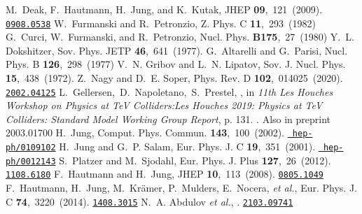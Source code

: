 \documentclass[11pt]{article} \usepackage{mystyle-new}
\begin{document}
\begin{mcbibliography}{10}
\relax
{}
M.~Deak, F.~Hautmann, H.~Jung, and K.~Kutak,
\newblock JHEP{} {\bf 09},~121~(2009).
\newblock \href{http://www.arXiv.org/abs/0908.0538}{{\tt 0908.0538}}\relax
\relax
{}
W.~Furmanski and R.~Petronzio,
\newblock Z. Phys. C{} {\bf 11},~293~(1982)\relax
\relax
{}
G.~Curci, W.~Furmanski, and R.~Petronzio,
\newblock Nucl. Phys.{} {\bf B175},~27~(1980)\relax
\relax
{}
Y.~L. Dokshitzer,
\newblock Sov. Phys. JETP{} {\bf 46},~641~(1977).
\relax
\relax
{}
G.~Altarelli and G.~Parisi,
\newblock Nucl. Phys. B{} {\bf 126},~298~(1977)\relax
\relax
{}
V.~N. Gribov and L.~N. Lipatov,
\newblock Sov. J. Nucl. Phys.{} {\bf 15},~438~(1972).
\relax
\relax
{}
Z.~Nagy and D.~E. Soper,
\newblock Phys. Rev. D{} {\bf 102},~014025~(2020).
\newblock \href{http://www.arXiv.org/abs/2002.04125}{{\tt 2002.04125}}\relax
\relax
{}
\mbox{L. Gellersen, D. Napoletano, S. Prestel},
,
\newblock in {\em {11th Les Houches Workshop on Physics at TeV Colliders}:{Les
  Houches 2019: Physics at TeV Colliders: Standard Model Working Group
  Report}}, p. 131.
.
\newblock Also in preprint \mbox{2003.01700}\relax
\relax
{}
H.~Jung,
\newblock Comput. Phys. Commun.{} {\bf 143},~100~(2002).
\newblock \href{http://www.arXiv.org/abs/hep-ph/0109102}{{\tt
  hep-ph/0109102}}\relax
\relax
{}
H.~Jung and G.~P. Salam,
\newblock Eur. Phys. J. C{} {\bf 19},~351~(2001).
\newblock \href{http://www.arXiv.org/abs/hep-ph/0012143}{{\tt
  hep-ph/0012143}}\relax
\relax
{}
S.~Platzer and M.~Sjodahl,
\newblock Eur. Phys. J. Plus{} {\bf 127},~26~(2012).
\newblock \href{http://www.arXiv.org/abs/1108.6180}{{\tt 1108.6180}}\relax
\relax
{}
F.~Hautmann and H.~Jung,
\newblock JHEP{} {\bf 10},~113~(2008).
\newblock \href{http://www.arXiv.org/abs/0805.1049}{{\tt 0805.1049}}\relax
\relax
{}
F.~Hautmann, H.~Jung, M.~Kr{\"a}mer, P.~Mulders, E.~Nocera, {\em et al.},
\newblock Eur. Phys. J. C{} {\bf 74},~3220~(2014).
\newblock \href{http://www.arXiv.org/abs/1408.3015}{{\tt 1408.3015}}\relax
\relax
{}
N.~A. Abdulov {\em et al.},
.
\newblock \href{http://www.arXiv.org/abs/2103.09741}{{\tt 2103.09741}}\relax
\relax
{}

\end{mcbibliography}
\end{document}
